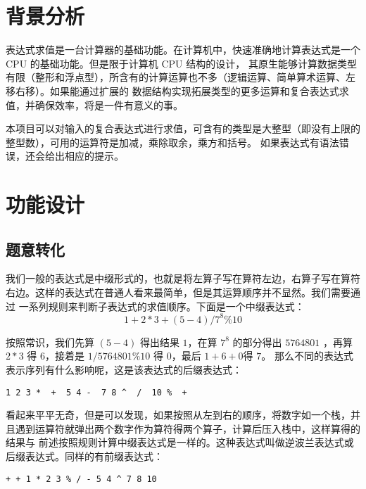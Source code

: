 
\chapter{背景分析}

表达式求值是一台计算器的基础功能。在计算机中，快速准确地计算表达式是一个 CPU 的基础功能。但是限于计算机 CPU 结构的设计，%
其原生能够计算数据类型有限（整形和浮点型），所含有的计算运算也不多（逻辑运算、简单算术运算、左移右移）。如果能通过扩展的%
数据结构实现拓展类型的更多运算和复合表达式求值，并确保效率，将是一件有意义的事。

本项目可以对输入的复合表达式进行求值，可含有的类型是大整型（即没有上限的整型数），可用的运算符是加减，乘除取余，乘方和括号。%
如果表达式有语法错误，还会给出相应的提示。

\chapter{功能设计}

\section{题意转化}

我们一般的表达式是{\kaishu 中缀形式}的，也就是将左算子写在算符左边，右算子写在算符右边。这样的表达式在普通人看来最简单，但是其运算顺序并不显然。我们需要通过%
一系列规则来判断子表达式的求值顺序。下面是一个中缀表达式：
\begin{equation}
    1 + 2 * 3 + (5 - 4) / 7^8 \% 10 \label{1}
\end{equation}

按照常识，我们先算 $(5-4)$ 得出结果 $1$，在算 $7^8$ 的部分得出 $5764801$ ，再算 $2*3$ 得 $6$，接着是 $1/5764801\%10$ 得 $0$，最后 $1+6+0 $得 $7$。%
那么不同的表达式表示序列有什么影响呢，这是该表达式的{\kaishu 后缀表达式}：

\begin{center}
\lstinline{1 2 3 *  +  5 4 -  7 8 ^  /  10 %  + }
\end{center}

看起来平平无奇，但是可以发现，如果按照从左到右的顺序，将数字如一个栈，并且遇到运算符就弹出两个数字作为算符得两个算子，计算后压入栈中，这样算得的结果与%
前述按照规则计算中缀表达式是一样的。这种表达式叫做{\kaishu 逆波兰表达式}或{\kaishu 后缀表达式}。同样的有前缀表达式：

\begin{center}
\lstinline{+ + 1 * 2 3 % / - 5 4 ^ 7 8 10}
\end{center}

